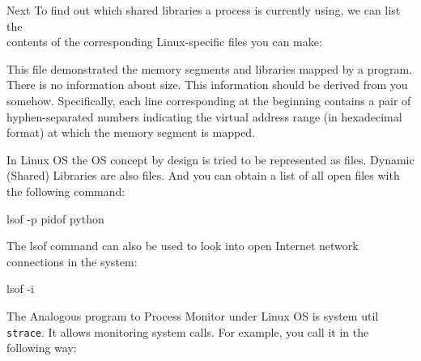 \documentclass[
]{article}
\newenvironment{Shaded}{}{}
\newcommand{\AttributeTok}[1]{\textcolor[rgb]{0.49,0.56,0.16}{#1}}
\newcommand{\ExtensionTok}[1]{#1}
\newcommand{\FunctionTok}[1]{\textcolor[rgb]{0.02,0.16,0.49}{#1}}
\newcommand{\KeywordTok}[1]{\textcolor[rgb]{0.00,0.44,0.13}{\textbf{#1}}}
\newcommand{\NormalTok}[1]{#1}
\newcommand{\VariableTok}[1]{\textcolor[rgb]{0.10,0.09,0.49}{#1}}
\begin{document}
\begin{Shaded}
\end{Shaded}

Next To find out which shared libraries a process is currently using, we
can list the\\
contents of the corresponding Linux-specific files you can make:

\begin{Shaded}
\end{Shaded}

This file demonstrated the memory segments and libraries mapped by a
program. There is no information about size. This information should be
derived from you somehow. Specifically, each line corresponding at the
beginning contains a pair of hyphen-separated numbers indicating the
virtual address range (in hexadecimal format) at which the memory
segment is mapped.

In Linux OS the OS concept by design is tried to be represented as
files. Dynamic (Shared) Libraries are also files. And you can obtain a
list of all open files with the following command:

\begin{Shaded}
\begin{Highlighting}[]
\ExtensionTok{lsof} \AttributeTok{{-}p} \KeywordTok{\textasciigrave{}}\FunctionTok{pidof}\NormalTok{ python}\KeywordTok{\textasciigrave{}}
\end{Highlighting}
\end{Shaded}

The lsof command can also be used to look into open Internet network
connections in the system:

\begin{Shaded}
\begin{Highlighting}[]
\ExtensionTok{lsof} \AttributeTok{{-}i}
\end{Highlighting}
\end{Shaded}

The Analogous program to Process Monitor under Linux OS is system util
\texttt{strace}. It allows monitoring system calls. For example, you
call it in the following way:
\end{document}
